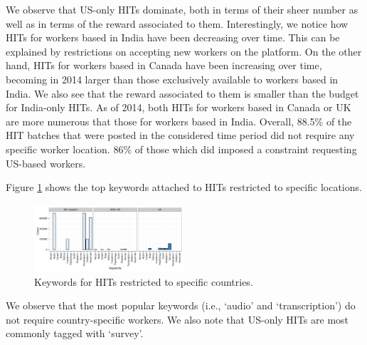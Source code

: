We observe that US-only HITs dominate, both in terms of their sheer number as well as in terms of the reward associated to them. 
Interestingly, we notice how HITs for workers based in India have been decreasing over time. This can be explained by \amt{} restrictions on accepting new workers on the platform.
On the other hand, HITs for workers based in Canada have been increasing over time, becoming in 2014 larger than those exclusively available to workers based in India.  We also see that the reward associated to them is smaller than the budget for India-only HITs.
As of 2014, both HITs for workers based in Canada or UK are more numerous that those for workers based in India.
Overall, 88.5\% of the HIT batches that were posted in the considered time period did not require any specific worker location. 86\% of those which did imposed a constraint requesting US-based workers.


Figure \ref{fig:keyword_loc} shows the top keywords attached to HITs restricted to specific locations.
\begin{figure}[tb]
	\centering
		\includegraphics[width=0.5\textwidth]{figures/keywords_location}
	\caption{Keywords for HITs restricted to specific countries.}
	\label{fig:keyword_loc}
\end{figure}
We observe that the most popular keywords (i.e., `audio' and `transcription') do not require country-specific workers. 
We also note that US-only HITs are most commonly tagged with `survey'.


